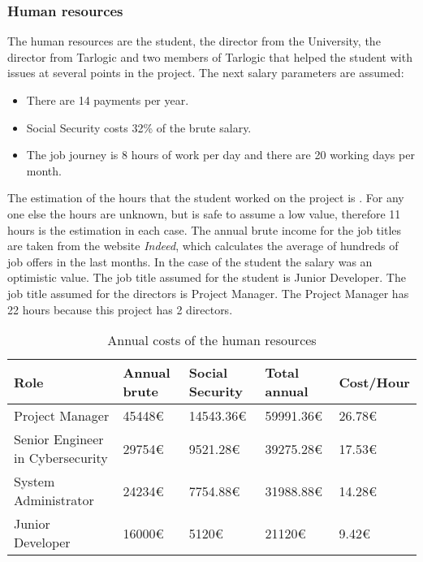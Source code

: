 \subsubsection{Human resources}
The human resources are the student, the director from the University, the director from Tarlogic and two members of Tarlogic that helped the student with issues at several points in the project.
\linej
\linej
The next salary parameters are assumed:
\begin{itemize}
	\item There are 14 payments per year.
	\item Social Security costs 32\% of the brute salary.
	\item The job journey is 8 hours of work per day and there are 20 working days per month.
\end{itemize}
\linej
The estimation of the hours that the student worked on the project is \projecthours.
For any one else the hours are unknown, but is safe to assume a low value, therefore 11 hours is the estimation in each case.
\linej
The annual brute income for the job titles are taken from the website \textit{Indeed}\cite{indeed}, which calculates the average of hundreds of job offers in the last months.
In the case of the student the salary was an optimistic value.
\linej
The job title assumed for the student is Junior Developer.
The job title assumed for the directors is Project Manager.
The Project Manager has 22 hours because this project has 2 directors.
\linej
\begin{table}[H]
	\begin{tabularx}{\textwidth}{|X|l|l|l|l|}
		\hline
		\rowcolor{gray!30}
		Role                             & Annual brute &  Social Security &    Total annual & Cost/Hour\\ \hline
		Project Manager                  & 45448\euro{}&   14543.36\euro{}& 59991.36\euro{}& 26.78\euro{}\\ \hline
		Senior Engineer in Cybersecurity & 29754\euro{}&    9521.28\euro{}& 39275.28\euro{}& 17.53\euro{}\\ \hline
		System Administrator             & 24234\euro{}&    7754.88\euro{}& 31988.88\euro{}& 14.28\euro{}\\ \hline
		Junior Developer                 & 16000\euro{}&       5120\euro{}&    21120\euro{}& 9.42\euro{}\\ \hline
	\end{tabularx}
	\caption{Annual costs of the human resources}
\end{table}
